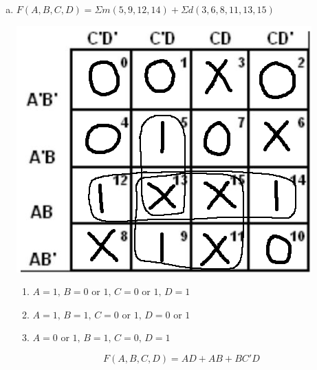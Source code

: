 \documentclass[11pt]{article}
\begin{document}
\begin{enumerate}[a)]
    \item 
    $F(A,B,C,D) = \Sigma m(5,9,12,14) + \Sigma d(3,6,8,11,13,15)$
    \vspace{-15pt}\begin{center}
        \includegraphics[scale=0.35]{3c.png}
    \end{center}
    \vspace{-20pt}\begin{enumerate}[$\bullet$]
        \item $A = 1,\, B = 0$ or $1,\, C = 0$ or $1,\, D = 1$
        \item \vspace{-5pt}$A = 1,\, B = 1,\, C = 0$ or $1,\, D = 0$ or $1$
        \item \vspace{-5pt}$A = 0$ or $1,\, B = 1,\, C = 0,\, D = 1$
    \end{enumerate}
    $$F(A,B,C,D) = AD + AB + BC'D$$

\end{enumerate}
\end{document}

